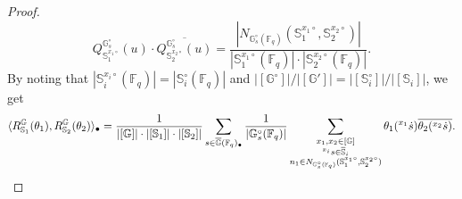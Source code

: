\documentclass{amsart}
\newcommand{\F}{\mathbb{F}}
\newcommand{\bbS}{\mathbb{S}}
\newcommand{\bbG}{\mathbb{G}}
\theoremstyle{plain}
\theoremstyle{definition}
\theoremstyle{remark}
\theoremstyle{theorem}
\begin{document}
\begin{proof}
\[Q_{\bbS_{1}^{x_{1}\circ}}^{\bbG_{s}^{\circ}}(u)\cdot\overline{Q_{\bbS_{2}^{x_{2}\circ}}^{\bbG_{s}^{\circ}}(u)}
=
\frac{|N_{\bbG_{s}^{\circ}(\F_{q})}(\bbS_{1}^{x_{1}\circ},\bbS_{2}^{x_{2}\circ})|}{|\bbS_{1}^{x_{1}\circ}(\F_{q})|\cdot|\bbS_{2}^{x_{2}\circ}(\F_{q})|}.
\]
By noting that $|\bbS_{i}^{x_{i}\circ}(\F_{q})|=|\bbS_{i}^{\circ}(\F_{q})|$ and $|[\bbG^{\circ}]|/|[\bbG']|=|[\bbS_{i}^{\circ}]|/|[\bbS_{i}]|$, we get
\[
\langle R_{\bbS_1}^{\bbG}(\theta_1),R_{\bbS_2}^{\bbG}(\theta_2)\rangle_{\bullet}
=
\frac{1}{|[\bbG]|\cdot|[\bbS_{1}]|\cdot|[\bbS_{2}]|}
\sum_{s\in\overline{\bbG}(\F_{q})_{\bullet}}
\frac{1}{|\bbG_{s}^{\circ}(\F_{q})|}
\sum_{\begin{subarray}{c}x_{1},x_{2}\in[\bbG]\\ {}^{x_{i}}s\in\overline{\bbS}_{i} \\ n_{1}\in N_{\bbG_{s}^{\circ}(\F_{q})}(\bbS_{1}^{x_{1}\circ},\bbS_{2}^{x_{2}\circ})\end{subarray}}
\theta_{1}({}^{x_{1}}\dot{s})\overline{\theta_{2}({}^{x_{2}}\dot{s})}.
\]


\end{proof}
\end{document}
